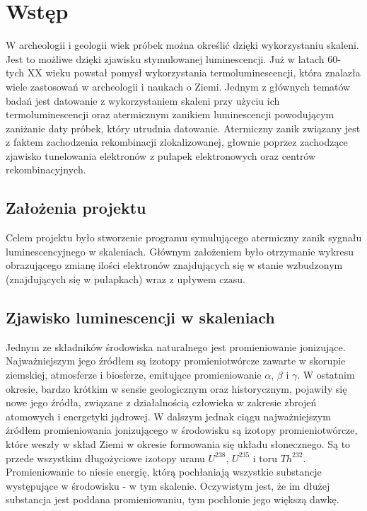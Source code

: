 \chapter{Wstęp}
W archeologii i geologii wiek próbek można określić dzięki wykorzystaniu skaleni. Jest to możliwe dzięki zjawisku stymulowanej luminescencji. Już w latach 60- tych  XX wieku powstał pomysł wykorzystania termoluminescencji, która znalazła wiele zastosowań w archeologii i naukach o Ziemi. Jednym z głównych tematów badań jest datowanie z wykorzystaniem skaleni przy użyciu ich termoluminescencji oraz atermicznym zanikiem luminescencji powodującym zaniżanie daty próbek, który utrudnia datowanie. Atermiczny zanik związany jest z faktem zachodzenia rekombinacji zlokalizowanej, głownie poprzez zachodzące zjawisko tunelowania elektronów z pułapek elektronowych oraz centrów rekombinacyjnych. 

\section{Założenia projektu}
Celem projektu było stworzenie programu symulującego atermiczny zanik sygnału luminescencyjnego w skaleniach. Głównym założeniem było otrzymanie wykresu obrazującego zmianę ilości elektronów znajdujących się w stanie wzbudzonym (znajdujących się w pułapkach) wraz z upływem czasu.

\section{Zjawisko luminescencji w skaleniach}


Jednym ze składników środowiska naturalnego jest promieniowanie jonizujące. Najważniejszym jego źródłem są izotopy promieniotwórcze zawarte w skorupie ziemskiej, atmosferze
i biosferze, emitujące promieniowanie $\alpha$, $\beta$ i $\gamma$. 
W ostatnim okresie, bardzo krótkim w sensie geologicznym oraz historycznym, pojawiły
się nowe jego źródła, związane z działalnością człowieka w zakresie zbrojeń atomowych
i energetyki jądrowej. W dalszym jednak ciągu najważniejszym źródłem promieniowania
jonizującego w środowisku są izotopy promieniotwórcze, które weszły w skład Ziemi w okresie
formowania się układu słonecznego.  Są to przede wszystkim długożyciowe izotopy uranu $U^{238}$, $U^{235}$ i toru $Th^{232}$. Promieniowanie to niesie energię, którą pochłaniają wszystkie substancje występujące
w środowisku - w tym skalenie. Oczywistym jest, że im dłużej substancja  jest poddana promieniowaniu, tym pochłonie jego większą dawkę.

